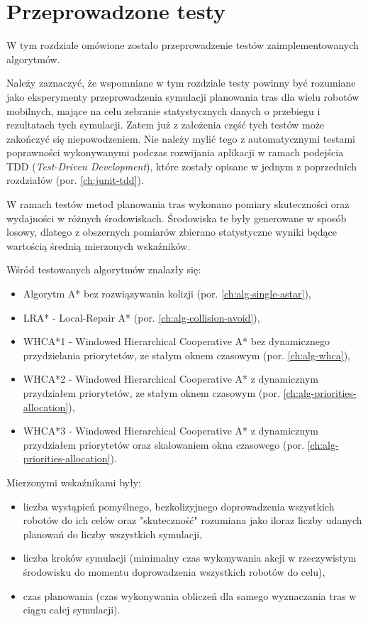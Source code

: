 \chapter{Przeprowadzone testy}
\label{ch:tests}
W tym rozdziale omówione zostało przeprowadzenie testów zaimplementowanych algorytmów.

Należy zaznaczyć, że wspomniane w tym rozdziale testy powinny być rozumiane jako eksperymenty przeprowadzenia symulacji planowania tras dla wielu robotów mobilnych, mające na celu zebranie statystycznych danych o przebiegu i rezultatach tych symulacji. Zatem już z założenia część tych testów może zakończyć się niepowodzeniem.
Nie należy mylić tego z automatycznymi testami poprawności wykonywanymi podczas rozwijania aplikacji w ramach podejścia TDD ({\it Test-Driven Development}), które zostały opisane w jednym z poprzednich rozdziałów (por. \ref{ch:junit-tdd}).

W ramach testów metod planowania tras wykonano pomiary skuteczności oraz wydajności w różnych środowiskach. 
Środowiska te były generowane w sposób losowy, dlatego z obszernych pomiarów zbierano statystyczne wyniki będące wartością średnią mierzonych wskaźników.

Wśród testowanych algorytmów znalazły się:
\begin{itemize}
	\item Algorytm A* bez rozwiązywania kolizji (por. \ref{ch:alg-single-astar}),
	\item LRA* - Local-Repair A* (por. \ref{ch:alg-collision-avoid}),
	\item WHCA*1 - Windowed Hierarchical Cooperative A* bez dynamicznego przydzielania priorytetów, ze stałym oknem czasowym (por. \ref{ch:alg-whca}),
	\item WHCA*2 - Windowed Hierarchical Cooperative A* z dynamicznym przydziałem priorytetów, ze stałym oknem czasowym (por. \ref{ch:alg-priorities-allocation}),
	\item WHCA*3 - Windowed Hierarchical Cooperative A* z dynamicznym przydziałem priorytetów oraz skalowaniem okna czasowego (por. \ref{ch:alg-priorities-allocation}).
\end{itemize}

Mierzonymi wskaźnikami były:
\begin{itemize}
	\item liczba wystąpień pomyślnego, bezkolizyjnego doprowadzenia wszystkich robotów do ich celów oraz "skuteczność" rozumiana jako iloraz liczby udanych planowań do liczby wszystkich symulacji,
	\item liczba kroków symulacji (minimalny czas wykonywania akcji w rzeczywistym środowisku do momentu doprowadzenia wszystkich robotów do celu),
	\item czas planowania (czas wykonywania obliczeń dla samego wyznaczania tras w ciągu całej symulacji).
\end{itemize}

